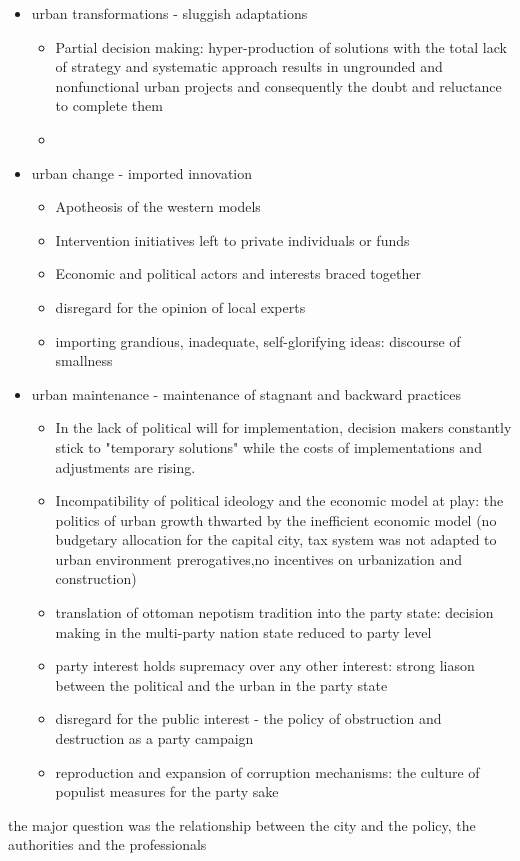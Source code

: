 \documentclass[11pt]{report}
\begin{document}
\begin{itemize}
\item urban transformations - sluggish adaptations
\\
\begin{itemize}
\item Partial decision making: hyper-production of solutions with the total lack of strategy and systematic approach results in ungrounded and nonfunctional urban projects and consequently the doubt and reluctance to complete them
\item 
\end{itemize}
\item urban change - imported innovation
\begin{itemize}
\item Apotheosis of the western models
\item Intervention initiatives left to private individuals or funds 
\item Economic and political actors and interests braced together
\item disregard for the opinion of local experts
\item importing grandious, inadequate, self-glorifying ideas: discourse of smallness
\end{itemize}
\item urban maintenance - maintenance of stagnant and backward practices
\\
\begin{itemize}
\item In the lack of political will for implementation, decision makers constantly stick to "temporary solutions" while the costs of implementations and adjustments are rising.
\item Incompatibility of political ideology and the economic model at play: the politics of urban growth thwarted by the inefficient economic model (no budgetary allocation for the capital city, tax system was not adapted to urban environment prerogatives,\footnotemark no incentives on urbanization and construction)
\item translation of ottoman nepotism tradition into the party state: decision making in the multi-party nation state reduced to party level
\item party interest holds supremacy over any other interest: strong liason between the political and the urban in the party state
\item disregard for the public interest - the policy of obstruction and destruction as a party campaign
\item reproduction and expansion of corruption mechanisms: the culture of populist measures for the party sake 
\end{itemize}
\end{itemize}
the major question was the relationship between the city and the policy, the authorities and the professionals
\end{document}
